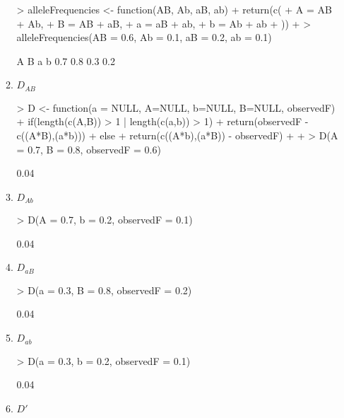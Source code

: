 \documentclass[12pt,a4paper]{paper}
\begin{document}
\begin{enumerate}
\begin{enumerate}
\begin{Schunk}
\begin{Sinput}
> alleleFrequencies <- function(AB, Ab, aB, ab) {
+   return(c(
+     A = AB + Ab,
+     B = AB + aB,
+     a = aB + ab,
+     b = Ab + ab
+   ))
+ }
> alleleFrequencies(AB = 0.6, Ab = 0.1, aB = 0.2, ab = 0.1)
\end{Sinput}
\begin{Soutput}
  A   B   a   b 
0.7 0.8 0.3 0.2 
\end{Soutput}
\end{Schunk}
\item $D_{AB}$
\begin{Schunk}
\begin{Sinput}
> D <- function(a = NULL, A=NULL, b=NULL, B=NULL, observedF) {
+   if(length(c(A,B)) > 1 | length(c(a,b)) > 1){
+     return(observedF - c((A*B),(a*b)))
+   } else{
+     return(c((A*b),(a*B)) - observedF)
+   }
+ }
> D(A = 0.7, B = 0.8, observedF = 0.6)
\end{Sinput}
\begin{Soutput}
[1] 0.04
\end{Soutput}
\end{Schunk}
\item $D_{Ab}$
\begin{Schunk}
\begin{Sinput}
> D(A = 0.7, b = 0.2, observedF = 0.1)
\end{Sinput}
\begin{Soutput}
[1] 0.04
\end{Soutput}
\end{Schunk}
\item $D_{aB}$
\begin{Schunk}
\begin{Sinput}
> D(a = 0.3, B = 0.8, observedF = 0.2)
\end{Sinput}
\begin{Soutput}
[1] 0.04
\end{Soutput}
\end{Schunk}
\item $D_{ab}$
\begin{Schunk}
\begin{Sinput}
> D(a = 0.3, b = 0.2, observedF = 0.1)
\end{Sinput}
\begin{Soutput}
[1] 0.04
\end{Soutput}
\end{Schunk}
\item $D'$
\begin{Schunk}
\begin{Sinput}

\end{Sinput}
\end{Schunk}
\end{enumerate}
\end{enumerate}
\end{document}
